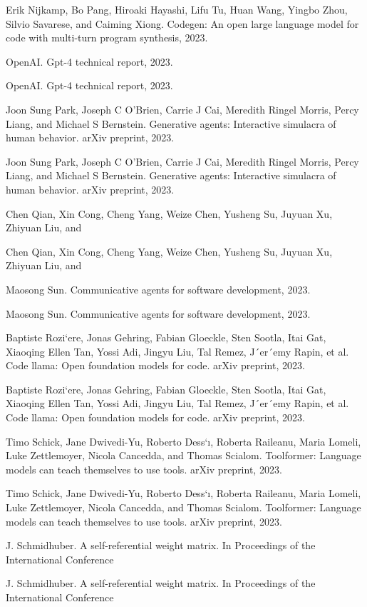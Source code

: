 \documentclass[12pt]{article}
\begin{document}
Erik Nijkamp, Bo Pang, Hiroaki Hayashi, Lifu Tu, Huan Wang, Yingbo Zhou, Silvio Savarese,
and Caiming Xiong. Codegen: An open large language model for code with multi-turn program
synthesis, 2023.


OpenAI. Gpt-4 technical report, 2023.


OpenAI. Gpt-4 technical report, 2023.


Joon Sung Park, Joseph C O’Brien, Carrie J Cai, Meredith Ringel Morris, Percy Liang, and
Michael S Bernstein. Generative agents: Interactive simulacra of human behavior. arXiv preprint,
2023.


Joon Sung Park, Joseph C O’Brien, Carrie J Cai, Meredith Ringel Morris, Percy Liang, and
Michael S Bernstein. Generative agents: Interactive simulacra of human behavior. arXiv preprint,
2023.


Chen Qian, Xin Cong, Cheng Yang, Weize Chen, Yusheng Su, Juyuan Xu, Zhiyuan Liu, and


Chen Qian, Xin Cong, Cheng Yang, Weize Chen, Yusheng Su, Juyuan Xu, Zhiyuan Liu, and


Maosong Sun. Communicative agents for software development, 2023.


Maosong Sun. Communicative agents for software development, 2023.


Baptiste Rozi`ere, Jonas Gehring, Fabian Gloeckle, Sten Sootla, Itai Gat, Xiaoqing Ellen Tan, Yossi
Adi, Jingyu Liu, Tal Remez, J´er´emy Rapin, et al. Code llama: Open foundation models for code.
arXiv preprint, 2023.


Baptiste Rozi`ere, Jonas Gehring, Fabian Gloeckle, Sten Sootla, Itai Gat, Xiaoqing Ellen Tan, Yossi
Adi, Jingyu Liu, Tal Remez, J´er´emy Rapin, et al. Code llama: Open foundation models for code.
arXiv preprint, 2023.


Timo Schick, Jane Dwivedi-Yu, Roberto Dess`ı, Roberta Raileanu, Maria Lomeli, Luke Zettlemoyer,
Nicola Cancedda, and Thomas Scialom. Toolformer: Language models can teach themselves to
use tools. arXiv preprint, 2023.


Timo Schick, Jane Dwivedi-Yu, Roberto Dess`ı, Roberta Raileanu, Maria Lomeli, Luke Zettlemoyer,
Nicola Cancedda, and Thomas Scialom. Toolformer: Language models can teach themselves to
use tools. arXiv preprint, 2023.


J. Schmidhuber. A self-referential weight matrix. In Proceedings of the International Conference


J. Schmidhuber. A self-referential weight matrix. In Proceedings of the International Conference
\end{document}
